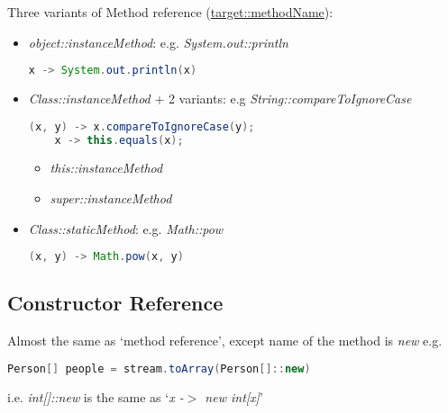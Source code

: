 \documentclass[12pt]{article}
\begin{document}
Three variants of Method reference (\underline{target::methodName}):
\begin{itemize}
    \item \emph{object::instanceMethod}: e.g. \emph{System.out::println}
    \begin{lstlisting}[language=Java]
    x -> System.out.println(x)
    \end{lstlisting}
    \item \emph{Class::instanceMethod} + 2 variants: e.g \emph{String::compareToIgnoreCase}
    \begin{lstlisting}[language=Java]
    (x, y) -> x.compareToIgnoreCase(y);
    x -> this.equals(x);
    \end{lstlisting}
    \begin{itemize}
        \item \emph{this::instanceMethod}
        \item \emph{super::instanceMethod}
    \end{itemize}
    \item \emph{Class::staticMethod}: e.g. \emph{Math::pow}
    \begin{lstlisting}[language=Java]
    (x, y) -> Math.pow(x, y)
    \end{lstlisting}
\end{itemize}

\subsection{Constructor Reference}
Almost the same as `method reference', except name of the method is \emph{new}
e.g.
\begin{lstlisting}[language=Java]
Person[] people = stream.toArray(Person[]::new)
\end{lstlisting}

i.e. \emph{int[]::new} is the same as `\emph{x -$>$ new int[x]}'
\end{document}
